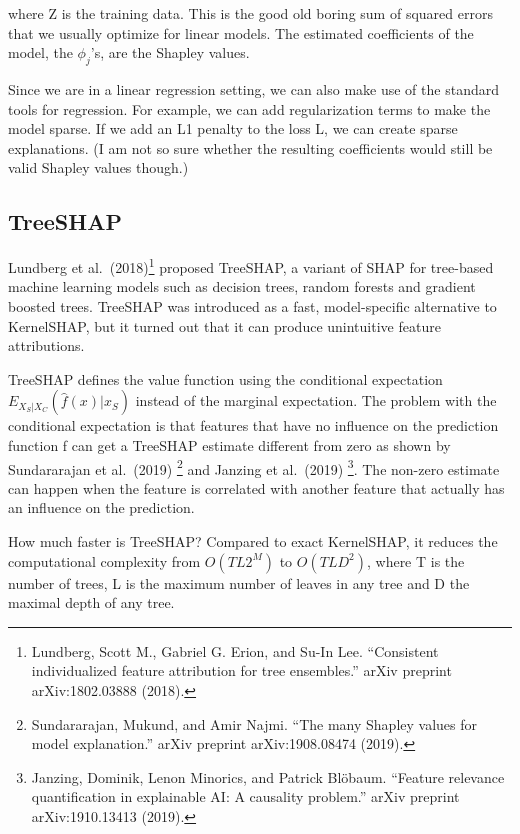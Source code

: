 \documentclass[
  11pt,
]{scrbook}
\begin{document}
where Z is the training data.
This is the good old boring sum of squared errors that we usually optimize for linear models.
The estimated coefficients of the model, the \(\phi_j\)'s, are the Shapley values.

Since we are in a linear regression setting, we can also make use of the standard tools for regression.
For example, we can add regularization terms to make the model sparse.
If we add an L1 penalty to the loss L, we can create sparse explanations.
(I am not so sure whether the resulting coefficients would still be valid Shapley values though.)

\hypertarget{treeshap}{%
\subsection{TreeSHAP}\label{treeshap}}

Lundberg et al.~(2018)\footnote{Lundberg, Scott M., Gabriel G. Erion, and Su-In Lee. ``Consistent individualized feature attribution for tree ensembles.'' arXiv preprint arXiv:1802.03888 (2018).} proposed TreeSHAP, a variant of SHAP for tree-based machine learning models such as decision trees, random forests and gradient boosted trees.
TreeSHAP was introduced as a fast, model-specific alternative to KernelSHAP, but it turned out that it can produce unintuitive feature attributions.

TreeSHAP defines the value function using the conditional expectation \(E_{X_S|X_C}(\hat{f}(x)|x_S)\) instead of the marginal expectation.
The problem with the conditional expectation is that features that have no influence on the prediction function f can get a TreeSHAP estimate different from zero as shown by Sundararajan et al.~(2019) \footnote{Sundararajan, Mukund, and Amir Najmi. ``The many Shapley values for model explanation.'' arXiv preprint arXiv:1908.08474 (2019).} and Janzing et al.~(2019) \footnote{Janzing, Dominik, Lenon Minorics, and Patrick Blöbaum. ``Feature relevance quantification in explainable AI: A causality problem.'' arXiv preprint arXiv:1910.13413 (2019).}.
The non-zero estimate can happen when the feature is correlated with another feature that actually has an influence on the prediction.

How much faster is TreeSHAP?
Compared to exact KernelSHAP, it reduces the computational complexity from \(O(TL2^M)\) to \(O(TLD^2)\), where T is the number of trees, L is the maximum number of leaves in any tree and D the maximal depth of any tree.
\end{document}
